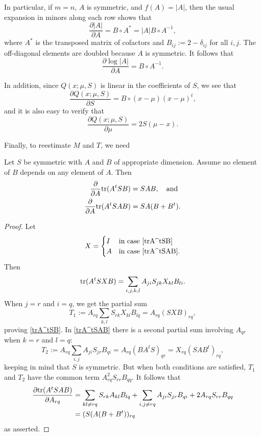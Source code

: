 \documentclass[12pt,leqno]{article}
\begin{document}
In particular, if $m=n$, $A$ is symmetric, and $f(A) = |A|$,  then the usual expansion 
in minors along each row shows that 
$$
\frac{\partial{|A|}}{\partial{A}} = B\circ{A}^* = |A|B\circ{A}^{-1},
$$
where $A^*$ is the transposed matrix of cofactors and $B_{ij} := 2-\delta_{ij}$ for all $i,j$.
The off-diagonal elements are doubled because $A$ is symmetric.
It follows that
\begin{equation}\label{partial_logdet}
  \frac{\partial{\log|A|}}{\partial{A}} = B\circ{A}^{-1}. 
\end{equation}

In addition, since $Q(x;\mu,S)$ is linear in the coefficients of $S$, we see that
\begin{equation}\label{dQ_dS}
\frac{\partial{Q(x;\mu,S)}}{\partial{S}} = B\circ(x-\mu)(x-\mu)^t,
\end{equation}
and it is also easy to verify that
\begin{equation}\label{dQ_dmu}
\frac{\partial{Q(x;\mu,S)}}{\partial{\mu}} = 2S(\mu-x).
\end{equation}

Finally, to reestimate $M$ and $T$, we need
\begin{Lem}
  Let $S$ be symmetric with $A$ and $B$  of appropriate dimension.
  Assume no element of $B$ depends on any element of $A$.  Then
  \begin{align}
    \frac{\partial}{\partial{A}}\text{\rm tr}(A^tSB) &= SAB,\quad\text{and}\label{trA^tSB}\\
  \frac{\partial}{\partial{A}}\text{\rm tr}(A^tSAB) &= SA(B+B^t). \label{trA^tSAB}
  \end{align}
  
    \end{Lem}
    \begin{proof}
      Let
      $$
      X = \begin{cases} I  & \text{in case \eqref{trA^tSB}}\\
            A & \text{in case \eqref{trA^tSAB}}.
          \end{cases}
          $$
          Then
      $$
      \text{\rm tr}(A^tSXB) = \sum_{i,j,k,l}A_{ji}S_{jk}X_{kl}B_{li}.
      $$
      When $j = r$ and $i = q$, we get the partial sum
      $$
      T_1 := A_{rq}\sum_{k,l}S_{rk}X_{kl}B_{lq}= A_{rq}(SXB)_{rq}, 
      $$
      proving \eqref{trA^tSB}. 
     In \eqref{trA^tSAB}  there is a second partial sum involving $A_{qr}$  when  $k = r$ and $l = q$:
      $$
      T_2 := A_{rq}\sum_{i,j} A_{ji}S_{jr}B_{qi} = A_{rq}(BA^tS)_{qr} = X_{rq}(SAB^t)_{rq},
      $$
      keeping in mind that $S$ is symmetric.
      But when both conditions are satisfied, $T_1$ and $T_2$ have the common term $A_{rq}^2S_{rr}B_{qq}$.
      It follows that
      \begin{align*}
      \frac{\partial{\ensuremath{\text{\rm tr}}(A^tSAB)}}{\partial{A_{rq}}} &=
                                                      \sum_{kl\neq rq} S_{rk}A_{kl}B_{lq} + \sum_{i,j\neq rq} A_{ji}S_{jr}B_{qi} + 2A_{rq}S_{rr}B_{qq}\\
                                                    &= (S(A(B + B^t))_{rq}\\
      \end{align*}
     as asserted.
    \end{proof}
    
\end{document}

